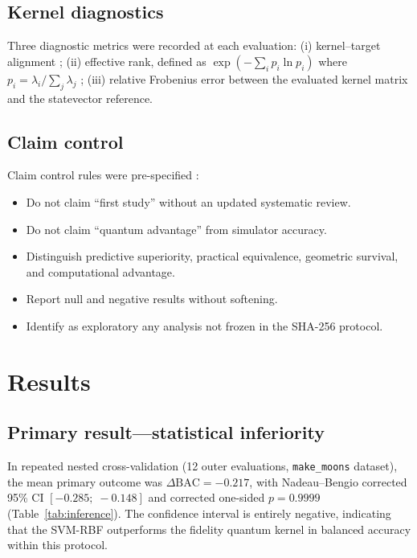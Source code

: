 \documentclass[11pt,a4paper]{article}
\newcommand{\BAC}{\mathrm{BAC}}
\begin{document}
\subsection{Kernel diagnostics}
\label{ssec:diagnostics}

Three diagnostic metrics were recorded at each evaluation: (i) kernel--target
alignment \citep{bowles2024better}; (ii) effective rank, defined as
$\exp(-\sum_i p_i \ln p_i)$ where $p_i = \lambda_i / \sum_j \lambda_j$
\citep{heyrand2022noisy}; (iii) relative Frobenius error between the evaluated
kernel matrix and the statevector reference.

\subsection{Claim control}
\label{ssec:claims}

Claim control rules were pre-specified \citep{bowles2024better,kakavand2026benchmarking}:
\begin{itemize}
  \item Do not claim ``first study'' without an updated systematic review.
  \item Do not claim ``quantum advantage'' from simulator accuracy.
  \item Distinguish predictive superiority, practical equivalence, geometric
        survival, and computational advantage.
  \item Report null and negative results without softening.
  \item Identify as exploratory any analysis not frozen in the SHA-256 protocol.
\end{itemize}

\section{Results}
\label{sec:results}

\subsection{Primary result---statistical inferiority}
\label{ssec:primary}

In repeated nested cross-validation (12 outer evaluations,
\texttt{make\_moons} dataset), the mean primary outcome was $\Delta\BAC =
-0.217$, with Nadeau--Bengio corrected 95\% CI $[-0.285;\; -0.148]$ and
corrected one-sided $p=0.9999$ (Table~\ref{tab:inference}). The confidence
interval is entirely negative, indicating that the SVM-RBF outperforms the
fidelity quantum kernel in balanced accuracy within this protocol.
\end{document}
